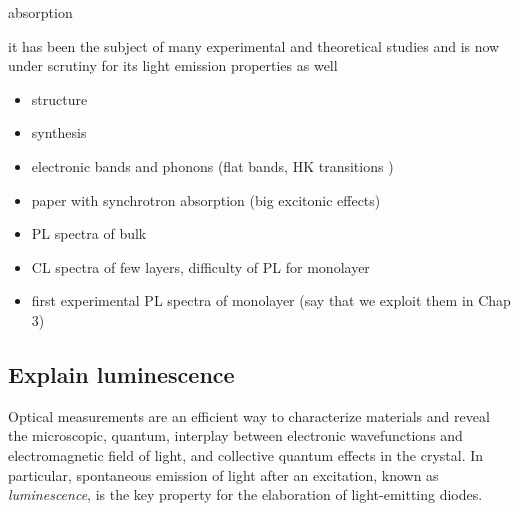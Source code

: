 absorption 

it has been the subject of many experimental and theoretical studies and is now under scrutiny for its light emission properties as well



\begin{itemize}
	\item structure
	\item synthesis
	\item electronic bands and phonons (flat bands, HK transitions \cite{fugallo})
	\item paper with synchrotron absorption (big excitonic effects)
	\item PL spectra of bulk
	\item CL spectra of few layers, difficulty of PL for monolayer
	\item first experimental PL spectra of monolayer (say that we exploit them in Chap 3) 
\end{itemize}


\subsection{Explain luminescence}
Optical measurements are an efficient way to characterize materials and reveal the microscopic, quantum, interplay between electronic wavefunctions and electromagnetic field of light, and collective quantum effects in the crystal.\cite{something} In particular, spontaneous emission of light after an excitation, known as \textit{luminescence}, is the key property for the elaboration of light-emitting diodes. 

